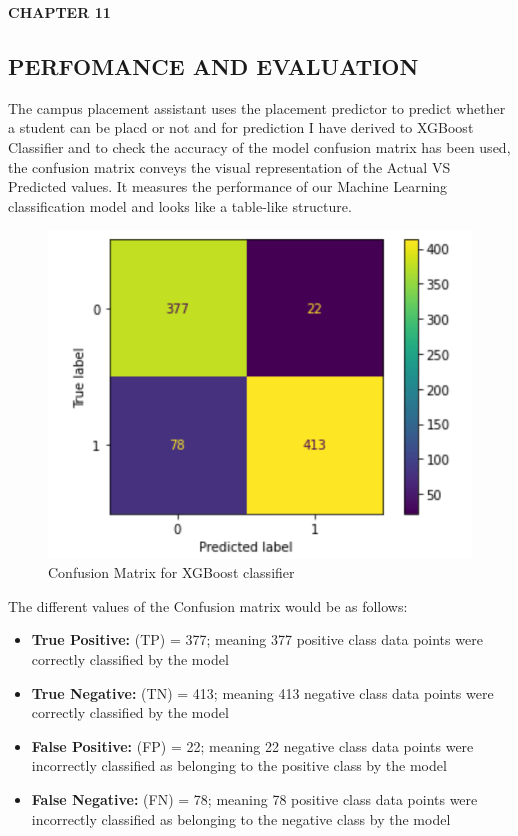 \documentclass[12pt]{article}
\begin{document}
\begin{flushleft}\textbf{CHAPTER 11} \end{flushleft}
\begin{flushleft}\section{PERFOMANCE AND EVALUATION} \end{flushleft}
The campus placement assistant uses the placement predictor to predict whether a student can be placd or not and for prediction I have derived to  XGBoost Classifier and to check the accuracy of the model confusion matrix has been used, the confusion matrix conveys the visual representation of the Actual VS Predicted values. It measures the performance of our Machine Learning classification model and looks like a table-like structure.
\begin{figure}[H]
\begin{center}
\includegraphics[scale=.4]{ResultP1}
\caption{Confusion Matrix for XGBoost classifier}
\end{center}
\end{figure}
The different values of the Confusion matrix would be as follows:
\begin{itemize}
\item \textbf{True Positive:} (TP) = 377; meaning 377 positive class data points were correctly classified by the model
\item \textbf{True Negative:} (TN) = 413; meaning 413 negative class data points were correctly classified by the model
\item \textbf{False Positive:} (FP) = 22; meaning 22 negative class data points were incorrectly classified as belonging to the positive class by the model
\item \textbf{False Negative:} (FN) = 78; meaning 78 positive class data points were incorrectly classified as belonging to the negative class by the model
\end {itemize}
\end{document}
